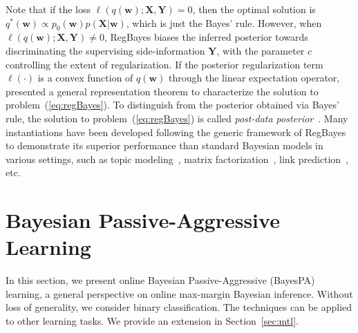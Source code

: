 \documentclass[twoside,11pt]{article}
\newcommand{\Xv}{\bm{X}}
\newcommand{\Yv}{\bm{Y}}
\newcommand{\wv}{\bm{w}}
\newcommand{\loss}{\ell}
\newcommand{\ud}{\mathrm{d}}
\newcommand{\KL}{\textbf{KL}}
\newcommand{\junx}[1]{{\color{red}{\bf\sf #1}}}
\begin{document}
Note that if the loss $\loss(q(\wv); \Xv, \Yv) = 0$, then the optimal solution is $q^*(\wv) \propto p_0(\wv) p(\Xv | \wv)$, which is just the Bayes' rule. However, when $\loss(q(\wv); \Xv, \Yv) \not= 0$, RegBayes biases the inferred posterior towards discriminating the supervising side-information $\Yv$, with the parameter $c$ controlling the extent of regularization. If the posterior regularization term $\ell(\cdot)$ is a convex function of $q(\wv)$ through the linear expectation operator, \cite{zhu2013bayesian} presented a general representation theorem to characterize the solution to problem~(\ref{eq:regBayes}). To distinguish from the posterior obtained via Bayes' rule, the solution to problem~(\ref{eq:regBayes}) is called {\it post-data posterior}~\citep{zhu2013bayesian}. Many instantiations have been developed following the generic framework of RegBayes to demonstrate its superior performance than standard Bayesian models in various settings, such as topic modeling~\citep{jiang2012monte,zhugibbs2013}, matrix factorization~\citep{xu2013fast}, link prediction~\citep{zhu2012maxlink}, etc.





\section{Bayesian Passive-Aggressive Learning}\label{sec:bpal}


In this section, we present online Bayesian Passive-Aggressive (BayesPA) learning, a general perspective on online max-margin Bayesian inference. Without loss of generality, we consider binary classification. The techniques can be applied to other learning tasks. We provide an extension in Section~\ref{sec:mtl}.
\end{document}
